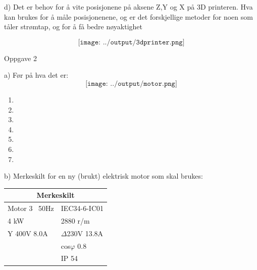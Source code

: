 \filbreak
d) Det er behov for å vite posisjonene på aksene Z,Y og X på 3D printeren. Hva kan brukes for å måle posisjonenene, og er det forskjellige metoder for noen som tåler strømtap, og for å få bedre nøyaktighet

$$\texttt{[image: ../output/3dprinter.png]}$$

Oppgave 2


a) Før på hva det er: \\ 

$$\texttt{[image: ../output/motor.png]}$$

\begin{enumerate}
	\item 
	\item 
	\item 
	\item 
	\item 
	\item 
	\item 
\end{enumerate}

\filbreak
b) Merkeskilt for en ny (brukt) elektrisk motor som skal brukes: \\

\begin{center}
\begin{tabular}{ | m{3cm} | m{3cm} | } 
\hline
\multicolumn{2}{|c|}{Merkeskilt} \\
\hline
Motor 3~ 50Hz	& IEC34-6-IC01 \\ 
\hline
4 kW & 2880 r/m \\
\hline
Y 400V 8.0A & $\Delta$230V 13.8A \\
\hline
& cos$\varphi$ 0.8 \\
\hline
& IP 54 \\
\hline
\end{tabular}
\end{center}

